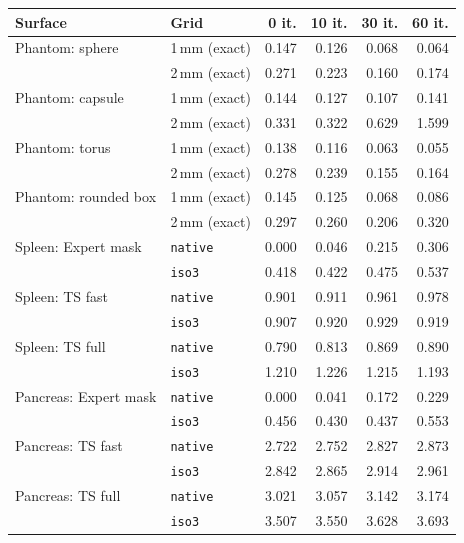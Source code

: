\begin{tabular}{llrrrr}
\toprule
Surface & Grid & 0 it. & 10 it. & 30 it. & 60 it. \\
\midrule
Phantom: sphere & 1\,mm (exact) & 0.147 & 0.126 & 0.068 & 0.064 \\
 & 2\,mm (exact) & 0.271 & 0.223 & 0.160 & 0.174 \\
Phantom: capsule & 1\,mm (exact) & 0.144 & 0.127 & 0.107 & 0.141 \\
 & 2\,mm (exact) & 0.331 & 0.322 & 0.629 & 1.599 \\
Phantom: torus & 1\,mm (exact) & 0.138 & 0.116 & 0.063 & 0.055 \\
 & 2\,mm (exact) & 0.278 & 0.239 & 0.155 & 0.164 \\
Phantom: rounded box & 1\,mm (exact) & 0.145 & 0.125 & 0.068 & 0.086 \\
 & 2\,mm (exact) & 0.297 & 0.260 & 0.206 & 0.320 \\
\midrule
Spleen: Expert mask & \texttt{native} & 0.000 & 0.046 & 0.215 & 0.306 \\
 & \texttt{iso3} & 0.418 & 0.422 & 0.475 & 0.537 \\
Spleen: TS fast & \texttt{native} & 0.901 & 0.911 & 0.961 & 0.978 \\
 & \texttt{iso3} & 0.907 & 0.920 & 0.929 & 0.919 \\
Spleen: TS full & \texttt{native} & 0.790 & 0.813 & 0.869 & 0.890 \\
 & \texttt{iso3} & 1.210 & 1.226 & 1.215 & 1.193 \\
Pancreas: Expert mask & \texttt{native} & 0.000 & 0.041 & 0.172 & 0.229 \\
 & \texttt{iso3} & 0.456 & 0.430 & 0.437 & 0.553 \\
Pancreas: TS fast & \texttt{native} & 2.722 & 2.752 & 2.827 & 2.873 \\
 & \texttt{iso3} & 2.842 & 2.865 & 2.914 & 2.961 \\
Pancreas: TS full & \texttt{native} & 3.021 & 3.057 & 3.142 & 3.174 \\
 & \texttt{iso3} & 3.507 & 3.550 & 3.628 & 3.693 \\
\bottomrule
\end{tabular}

